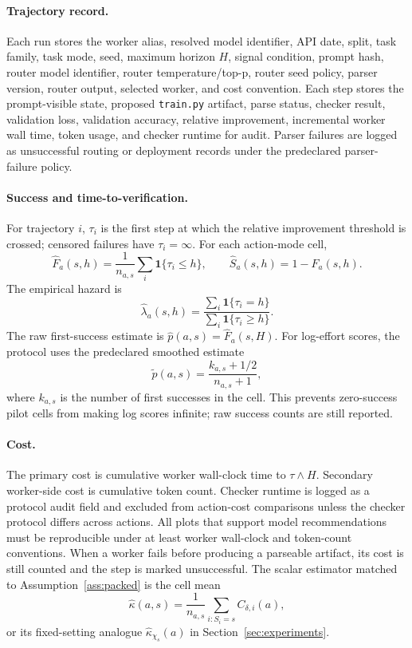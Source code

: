 \documentclass{article}
\newcommand{\one}{\mathbf{1}}
\begin{document}
\paragraph{Trajectory record.}
Each run stores the worker alias, resolved model identifier, API date, split, task family, task mode, seed, maximum horizon $H$, signal condition, prompt hash, router model identifier, router temperature/top-p, router seed policy, parser version, router output, selected worker, and cost convention.
Each step stores the prompt-visible state, proposed \texttt{train.py} artifact, parse status, checker result, validation loss, validation accuracy, relative improvement, incremental worker wall time, token usage, and checker runtime for audit.
Parser failures are logged as unsuccessful routing or deployment records under the predeclared parser-failure policy.

\paragraph{Success and time-to-verification.}
For trajectory $i$, $\tau_i$ is the first step at which the relative improvement threshold is crossed; censored failures have $\tau_i=\infty$.
For each action-mode cell,
\[
  \hat F_a(s,h)=\frac{1}{n_{a,s}}\sum_i\one\{\tau_i\le h\},
  \qquad
  \hat S_a(s,h)=1-\hat F_a(s,h).
\]
The empirical hazard is
\[
  \hat\lambda_a(s,h)=
  \frac{\sum_i\one\{\tau_i=h\}}
       {\sum_i\one\{\tau_i\ge h\}} .
\]
The raw first-success estimate is $\hat p(a,s)=\hat F_a(s,H)$.
For log-effort scores, the protocol uses the predeclared smoothed estimate
\[
\tilde p(a,s)=\frac{k_{a,s}+1/2}{n_{a,s}+1},
\]
where $k_{a,s}$ is the number of first successes in the cell.
This prevents zero-success pilot cells from making log scores infinite; raw success counts are still reported.

\paragraph{Cost.}
The primary cost is cumulative worker wall-clock time to $\tau\wedge H$.
Secondary worker-side cost is cumulative token count.
Checker runtime is logged as a protocol audit field and excluded from action-cost comparisons unless the checker protocol differs across actions.
All plots that support model recommendations must be reproducible under at least worker wall-clock and token-count conventions.
When a worker fails before producing a parseable artifact, its cost is still counted and the step is marked unsuccessful.
The scalar estimator matched to Assumption~\ref{ass:packed} is the cell mean
\[
\hat\kappa(a,s)=\frac{1}{n_{a,s}}\sum_{i:S_i=s} C_{\delta,i}(a),
\]
or its fixed-setting analogue $\hat\kappa_{\chi_s}(a)$ in Section~\ref{sec:experiments}.
\end{document}
